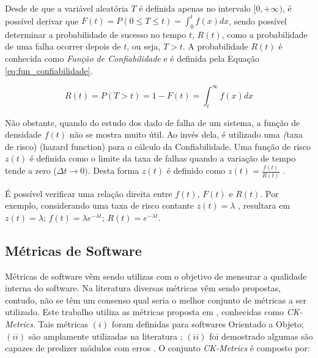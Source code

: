 \documentclass[12pt]{article}
\begin{document}
Desde de que a variável aleatória $T$ é definida apenas no intervalo
$[0,+\infty)$, é possível derivar que $ F(t) = P(0 \le T \le t) =
    \int_0^{t}f(x)dx$, sendo possível determinar a probabilidade de sucesso no
    tempo $t$, $R(t)$, como a probabilidade de uma falha ocorrer depois de $t$,
    ou seja, $T > t$. A probabilidade $R(t)$ é conhecida como \textit{Função de
    Confiabilidade{}} e é definida pela Equação \ref{eq:fun_confiabilidade}.

\begin{equation} \label{eq:fun_confiabilidade}
    R(t) = P(T > t) = 1- F(t) = \int_t^{\infty} f(x)dx
\end{equation}

Não obstante, quando do estudo dos dado de falha de um sistema, a função de
densidade $f(t)$ não se mostra muito útil. Ao invés dela, é utilizado uma
\textit (taxa de risco) (hazard function) para o cálculo da Confiabilidade. Uma
função de risco $z(t)$ é definida como o limite da taxa de falhas quando a
variação de tempo tende a zero ($\Delta{}t \to 0).$ Desta forma $z(t)$ é
definido como $ z(t) = \frac{f(t)}{R(t)}$ \cite{lyu1996handbook}.

É possível verificar uma relação direita entre $f(t)$, $F(t)$ e $R(t)${}. Por
exemplo, considerando uma taxa de risco contante $z(t) = \lambda$ , resultara em
$z(t) = \lambda$; $f(t) = \lambda{}e^{-\lambda{}t}$; $R(t) = e^{-\lambda{}t}${}.

\subsection{Métricas de Software}
\label{subsec:metricas}

Métricas de software vêm sendo utilizas com o objetivo de mensurar a qualidade
interna do software. Na literatura diversas métricas vêm sendo propostas,
contudo, não se têm um consenso qual seria o melhor conjunto de métricas a ser
utilizado. Este trabalho utiliza as métricas proposta em
\cite{chidamber1994metrics}{}, conhecidas como \textit{CK-Metrics}. Tais
métricas $(i)$ foram definidas para softwares Orientado a Objeto; $(ii)$ são
amplamente utilizadas na literatura \cite{radjenovic2013software}; $(ii)$ foi
demostrado algumas são capazes de predizer módulos com erros
\cite{basili1996validation}. O conjunto \textit{CK-Metrics} é composto por:
\end{document}
